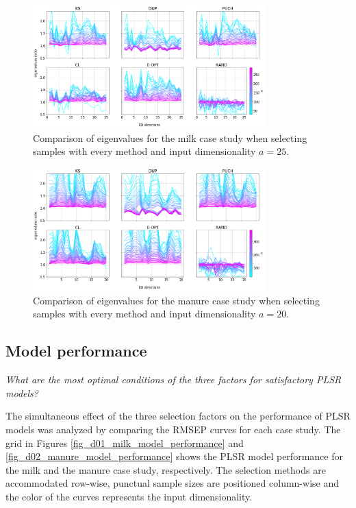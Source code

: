 \documentclass[journal=ancham,manuscript=article]{achemso}
\begin{document}
\begin{figure}[b]
\includegraphics[width=0.8\textwidth]{manuscript/figures/d01_milk_specific_framework_eigenvalsratio.png}
\centering
\caption{Comparison of eigenvalues for the milk case study when selecting samples with every method and input dimensionality $a=25$.}
\label{fig_d01_milk_specific_framework_eigenvalsratio}
\end{figure}

\begin{figure}[b]
\includegraphics[width=0.8\textwidth]{manuscript/figures/d02_manure_specific_framework_eigenvalsratio.png}
\centering
\caption{Comparison of eigenvalues for the manure case study when selecting samples with every method and input dimensionality $a=20$.}
\label{fig_d02_manure_specific_framework_eigenvalsratio}
\end{figure}

\subsection*{Model performance}\label{results:modperformance}


\emph{What are the most optimal conditions of the three factors for satisfactory PLSR models?}

The simultaneous effect of the three selection factors on the performance of PLSR models was analyzed by comparing the RMSEP curves for each case study. The grid in Figures \ref{fig_d01_milk_model_performance} and \ref{fig_d02_manure_model_performance} shows the PLSR model performance for the milk and the manure case study, respectively. The selection methods are accommodated row-wise, punctual sample sizes are positioned column-wise and the color of the curves represents the input dimensionality. 
\end{document}
